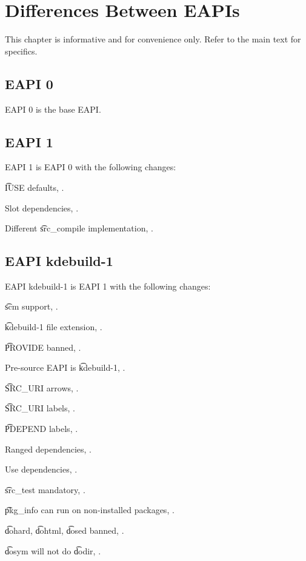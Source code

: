 \chapter{Differences Between EAPIs}

\note This chapter is informative and for convenience only. Refer to the main text for specifics.

\section*{EAPI 0}

EAPI 0 is the base EAPI.

\section*{EAPI 1}

EAPI 1 is EAPI 0 with the following changes:

\begin{compactitem}
\item \t{IUSE} defaults, .
\item Slot dependencies, .
\item Different \t{src\_compile} implementation, .
\end{compactitem}

\IFKDEBUILDELSE
{
    \section*{EAPI kdebuild-1}

    EAPI kdebuild-1 is EAPI 1 with the following changes:

    \begin{compactitem}
    \item \t{scm} support, .
    \item \t{kdebuild-1} file extension, .
    \item \t{PROVIDE} banned, .
    \item Pre-source EAPI is \t{kdebuild-1}, .
    \item \t{SRC\_URI} arrows, .
    \item \t{SRC\_URI} labels, .
    \item \t{PDEPEND} labels, .
    \item Ranged dependencies, .
    \item Use dependencies, .
    \item \t{src\_test} mandatory, .
    \item \t{pkg\_info} can run on non-installed packages, .
    \item \t{dohard}, \t{dohtml}, \t{dosed} banned, .
    \item \t{dosym} will not do \t{dodir}, .
    \end{compactitem}
}{
}

